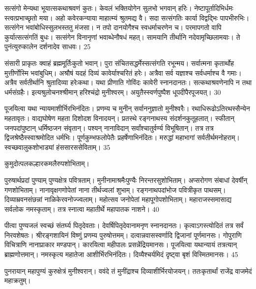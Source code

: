   सत्संगो मेन्यथा भूयात्सकथाश्रवणं कुतः।
 केवलं भक्तियोगेन सुलभो भगवान् हरिः।
 नेष्टापूर्तादिभिर्धमः स्त्वत्प्रभाच्छृतो मया।
 अहो कवेरकन्याया माहात्म्यं श्रुतमद्य वै।
 सदा सत्संगतिः कार्या विद्वद्भिः पापभीरुभिः।
 सत्संगेन भवांबोधिस्सुलभस्ततु मंजसा।
 न तपो दानयोगैश्च स्वधर्माचरणेन च।
 परमापगतो वापि कुर्यात्सत्संगतिं बुधः।
 सत्संगेन विनानृणां भवाब्धेनौषधं महत्।
 सामयानि तीर्थानि नदेवामृच्छिलामयाः।
 ते पुनंत्युरुकालेन दर्शनादेव साधवः।
 25

 
संसारी प्राकृतः क्वाहं ब्रह्ममूर्तिःकुतो भवान्।
 पुरा संचितसद्धर्मेस्सत्संगति रभून्मय।
 सर्वात्मना कृतार्थोह मुत्तीर्णोस्मि भवांबुधिम्।
 अश्रौषं यदहं दिव्यं कावेर्याश्चरितं हरेः।
 अत्रैवा सर्व यज्ञाश्च सर्वधर्माश्च वै गमाः।
 अत्रैव सर्वतीर्थानि श्रुतादिव्या हरेःकथा।
 यथा प्रीणाति गोविंदः कावेरी स्नानदानतः।
 सत्कथाश्रवणेनापि न तथा धर्मसंग्रहैः।
 इत्यश्रुलोचनश्श्रीमान् हरिश्चंद्रो मुनीश्वरम्।
 अयुतैस्स्वर्णपुष्पैश धूपदीपैरपूजयत्।
 30

  पूजयित्वा यथा न्यायमाशीर्भिरभिनंदितः।
 प्रणम्य च मुनीन् सर्वाननुज्ञातो मुनीश्वरैः।
 रथाधिरूढोऽतिरथस्सैन्येन महतावृतः।
 वाद्यघोषेण महता दिशोदश विनादयन्।
 प्रतस्थे रङ्गनाथस्य संदर्शनकुतूहलात्।
 स्फीतान् जनपदांपुष्टान् धर्मिष्ठजन संवृतान्।
 पश्यन् नानाविदान् सर्वांश्चातुर्वर्ण्य विभूषितान्।
 तत्र तत्र द्विजश्रेष्ठैस्स्वाश्रमोदित धर्मभिः।
 पूर्णकुम्भफलोपेतैः प्रहर्षेणाभिनंदितः।
 मरुद्धां महाभागां सर्वतीर्थमनोहराम्।
 स्वच्छवालुकशोभाड्यां हंससारससेविताम्।
 35

  कुमुदोत्पलकल्हारकमलैरुपशोभिताम्।

पुरुषार्थप्रदां पुण्याम् पुण्यक्षेत्र पवित्रताम्।
 मुनीनामाश्रमैःपुण्यैः निरन्तरसुशोभिताम्।
 अप्सरोगण संबाधां देवर्षीन् गणशोभिताम्।
 नानावृक्षगणोपेतां नाना तीर्थज्वलां शुभाम्।
 रङ्गनाथपदांभोज पवित्रीकृत पाथसम्।
 दिव्याम्रवनसंछन्नां नाळिकेरवनोज्ज्वलाम्।
 महोत्सव जनोपेतां महापूगोपशोभिताम्।
 महाराजस्समासाद्य सर्वलोक नमस्कृताम्।
 तत्र स्नात्वा महातीर्थे महापातक नाशने।
 40

  पीत्वा पुण्यजलं स्वच्छं संतर्घ्य पितृदेवताः।
 देवर्षिपितृदेवानामनृण स्नानदानतः।
 कृत्वाऽगस्त्योदितं तत्र सर्वं निरवशेषतः।
 श्रीरङ्गशायिनं विष्णुं प्रणम्य पुरुषोत्तमम्।
 दत्वान्नवासस्वर्णादि द्विजानां पूर्णमानसः।
 गोपुराणि विचित्राणि नानाप्राकार मण्डपान्।
 कारयित्वा महीपालः प्रसन्नेंद्रियमानसः।
 पूजयित्वा यथान्यायं तत्रत्यान् ब्राह्मणोत्तमान्।
 नमस्कृत्य महातेजा आशीर्भिरभिनंदितः।
 दिव्यैश्चर्यमिदं दृष्ट्वा बृशं विस्मितमानसः।
 45

  पुनरायान् महापुण्यं कुरुक्षेत्रं मुनीश्वरान्।
 ववंदे तं मुनींद्राश्च दिव्याशीर्भिरयोजयन्।
 ततःकृतार्थां राजेंद्र वाजमेदं महाक्रतुम्।
 
